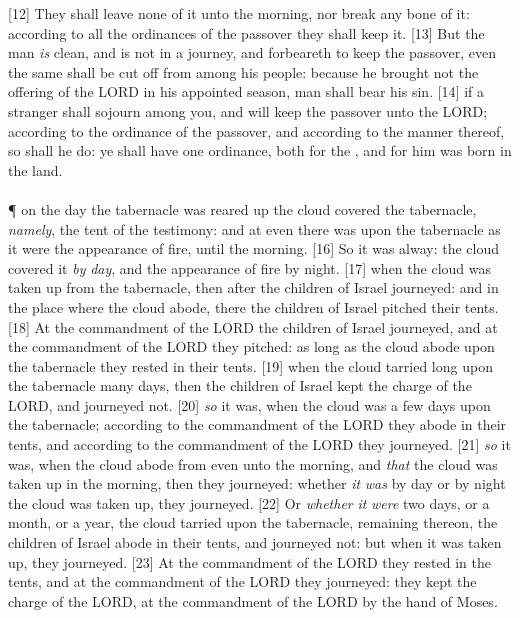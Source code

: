 [12] \textcolor[cmyk]{0.99998,1,0,0}{They shall leave none of it unto the morning, nor break any bone of it: according to all the ordinances of the passover they shall keep it.}
[13] \textcolor[cmyk]{0.99998,1,0,0}{But the man  \emph{is} clean, and is not in a journey, and forbeareth to keep the passover, even the same  shall be cut off from among his people: because he brought not the offering of the LORD in his appointed season,  man shall bear his sin.}
[14] \textcolor[cmyk]{0.99998,1,0,0}{ if a stranger shall sojourn among you, and will keep the passover unto the LORD; according to the ordinance of the passover, and according to the manner thereof, so shall he do: ye shall have one ordinance, both for the , and for him  was born in the land.}\\
\\
\P \textcolor[cmyk]{0.99998,1,0,0}{ on the day  the tabernacle was reared up the cloud covered the tabernacle, \emph{namely}, the tent of the testimony: and at even there was upon the tabernacle as it were the appearance of fire, until the morning.}
[16] \textcolor[cmyk]{0.99998,1,0,0}{So it was alway: the cloud covered it \emph{by} \emph{day}, and the appearance of fire by night.}
[17] \textcolor[cmyk]{0.99998,1,0,0}{ when the cloud was taken up from the tabernacle, then after  the children of Israel journeyed: and in the place where the cloud abode, there the children of Israel pitched their tents.}
[18] \textcolor[cmyk]{0.99998,1,0,0}{At the commandment of the LORD the children of Israel journeyed, and at the commandment of the LORD they pitched: as long as the cloud abode upon the tabernacle they rested in their tents.}
[19] \textcolor[cmyk]{0.99998,1,0,0}{ when the cloud tarried long upon the tabernacle many days, then the children of Israel kept the charge of the LORD, and journeyed not.}
[20] \textcolor[cmyk]{0.99998,1,0,0}{ \emph{so} it was, when the cloud was a few days upon the tabernacle; according to the commandment of the LORD they abode in their tents, and according to the commandment of the LORD they journeyed.}
[21] \textcolor[cmyk]{0.99998,1,0,0}{ \emph{so} it was, when the cloud abode from even unto the morning, and \emph{that} the cloud was taken up in the morning, then they journeyed: whether \emph{it} \emph{was} by day or by night  the cloud was taken up, they journeyed.}
[22] \textcolor[cmyk]{0.99998,1,0,0}{Or \emph{whether} \emph{it} \emph{were} two days, or a month, or a year,  the cloud tarried upon the tabernacle, remaining thereon, the children of Israel abode in their tents, and journeyed not: but when it was taken up, they journeyed.}
[23] \textcolor[cmyk]{0.99998,1,0,0}{At the commandment of the LORD they rested in the tents, and at the commandment of the LORD they journeyed: they kept the charge of the LORD, at the commandment of the LORD by the hand of Moses.}
